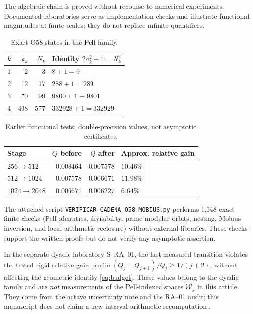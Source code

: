 \documentclass[11pt,a4paper]{article}
\theoremstyle{mine}
\theoremstyle{definition}
\newcommand{\WW}{\mathcal W}
\begin{document}
The algebraic chain is proved without recourse to numerical experiments. Documented laboratories serve as implementation checks and illustrate functional magnitudes at finite scales; they do not replace infinite quantifiers.

\begin{table}[ht]
\centering\small
\caption{Exact O58 states in the Pell family.}
\begin{tabular}{@{}r r r l@{}}\toprule
$k$&$a_k$&$N_k$&Identity $2a_k^2+1=N_k^2$\\\midrule
1&2&3&$8+1=9$\\
2&12&17&$288+1=289$\\
3&70&99&$9800+1=9801$\\
4&408&577&$332928+1=332929$\\\bottomrule
\end{tabular}
\end{table}

\begin{table}[ht]
\centering\small
\caption{Earlier functional tests; double-precision values, not asymptotic certificates.}
\begin{tabular}{@{}l r r l@{}}\toprule
Stage&$Q$ before&$Q$ after&Approx. relative gain\\\midrule
$256\to512$&$0.008464$&$0.007578$&$10.46\%$\\
$512\to1024$&$0.007578$&$0.006671$&$11.98\%$\\
$1024\to2048$&$0.006671$&$0.006227$&$6.64\%$\\\bottomrule
\end{tabular}
\end{table}

The attached script \texttt{VERIFICAR\_CADENA\_O58\_MOBIUS.py} performs 1,648 exact finite checks (Pell identities, divisibility, prime-modular orbits, nesting, M\"obius inversion, and local arithmetic reclosure) without external libraries. These checks support the written proofs but do not verify any asymptotic assertion.

In the separate dyadic laboratory S--RA--01, the last measured transition violates the tested rigid relative-gain profile $(Q_j-Q_{j+1})/Q_j\ge1/(j+2)$, without affecting the geometric identity \eqref{eq:budget}. These values belong to the dyadic family and are \emph{not} measurements of the Pell-indexed spaces $\WW_j$ in this article. They come from the octave uncertainty note and the RA--01 audit; this manuscript does not claim a new interval-arithmetic recomputation \cite{Incert,RA01Audit}.
\end{document}
